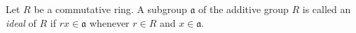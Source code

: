 Let $R$ be a commutative ring. A subgroup $\mathfrak{a}$ of the additive group $R$ is called an \emph{ideal} of $R$ if $rx \in \mathfrak{a}$ whenever $r \in R$ and $x \in \mathfrak{a}$.
